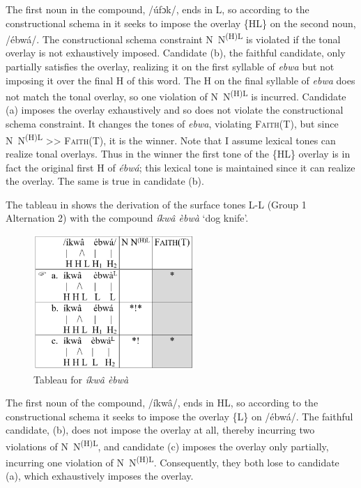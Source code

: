 \documentclass[output=paper]{langscibook}
\begin{document}
The first noun in the compound, /úfɔk/, ends in L, so according to the constructional schema in  it seeks to impose the overlay \{HL\} on the second noun, /ébwá/. The constructional schema constraint N~N\textsuperscript{(H)L} is violated if the tonal overlay is not exhaustively imposed. Candidate (b), the faithful candidate, only partially satisfies the overlay, realizing it on the first syllable of \textit{ebwa} but not imposing it over the final H of this word. The H on the final syllable of \textit{ebwa} does not match the tonal overlay, so one violation of N~N\textsuperscript{(H)L} is incurred. Candidate (a) imposes the overlay exhaustively and so does not violate the constructional schema constraint. It changes the tones of \textit{ebwa}, violating \textsc{Faith(T)}, but since N~N\textsuperscript{(H)L} {>}{>} \textsc{Faith(T)}, it is the winner. Note that I assume lexical tones can realize tonal overlays. Thus in the winner the first tone of the \{HL\} overlay is in fact the original first H of \textit{ébwá}; this lexical tone is maintained since it can realize the overlay. The same is true in candidate (b). 

The tableau in  shows the derivation of the surface tones L-L (Group 1 Alternation 2) with the compound \textit{íkwâ èbwà} ‘dog knife’. 

  
\begin{figure}
\includegraphics[width=61mm]{figures/glewwe-img3.png}
\caption{Tableau for \textit{íkwâ èbwà}}
\label{fig:glewwe:4}
\end{figure}

The first noun of the compound, /íkwâ/, ends in HL, so according to the constructional schema it seeks to impose the overlay \{L\} on /ébwá/. The faithful candidate, (b), does not impose the overlay at all, thereby incurring two violations of N~N\textsuperscript{(H)L}, and candidate (c) imposes the overlay only partially, incurring one violation of N~N\textsuperscript{(H)L}. Consequently, they both lose to candidate (a), which exhaustively imposes the overlay.     
\end{document}
